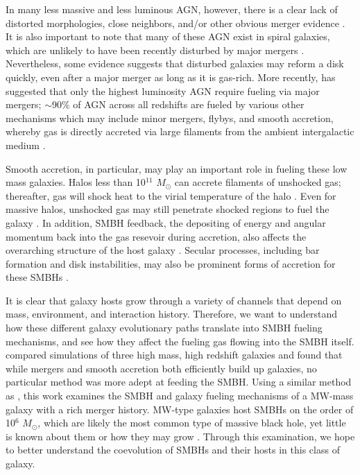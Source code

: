 \documentclass[manuscript]{aastex}
\begin{document}
In many less massive and less luminous AGN, however, there is a clear lack of distorted morphologies, close neighbors, and/or other obvious merger evidence \citep{Ryan2007,Schawinski2011,Ellison2013,Hicks2013}. It is also important to note that many of these AGN exist in spiral galaxies, which are unlikely to have been recently disturbed by major mergers \citep{Schawinski2011,Kocevski2011}. Nevertheless, some evidence suggests \citep{vanGorkom1997,Governato2009} that disturbed galaxies may reform a disk quickly, even after a major merger as long as it is gas-rich. More recently, \cite{Treister2012} has suggested that only the highest luminosity AGN require fueling via major mergers; $\sim$90\% of AGN across all redshifts are fueled by various other mechanisms which may include minor mergers, flybys, and smooth accretion, whereby gas is directly accreted via large filaments from the ambient intergalactic medium \citep{Cox2006,Bellovary2013,Sinha2012}. 

Smooth accretion, in particular, may play an important role in fueling these low mass galaxies. Halos less than 10$^{11}$ $M_{\odot}$ can accrete filaments of unshocked gas; thereafter, gas will shock heat to the virial temperature of the halo \citep{Keres2005}. Even for massive halos, unshocked gas may still penetrate shocked regions to fuel the galaxy \citep{Brooks2007,Dekel2009,Nelson2013}. In addition, SMBH feedback, the depositing of energy and angular momentum back into the gas resevoir during accretion, also affects the overarching structure of the host galaxy \citep{Governato2009a}. Secular processes, including bar formation and disk instabilities, may also be prominent forms of accretion for these SMBHs \citep{Kormendy2013}. 

It is clear that galaxy hosts grow through a variety of channels that depend on mass, environment, and interaction history. Therefore, we want to understand how these different galaxy evolutionary paths translate into SMBH fueling mechanisms, and see how they affect the fueling gas flowing into the SMBH itself. \cite{Bellovary2013} compared simulations of three high mass, high redshift galaxies and found that while mergers and smooth accretion both efficiently build up galaxies, no particular method was more adept at feeding the SMBH. Using a similar method as \cite{Bellovary2013}, this work examines the SMBH and galaxy fueling mechanisms of a MW-mass galaxy with a rich merger history. MW-type galaxies host SMBHs on the order of 10$^6$ $M_{\odot}$, which are likely the most common type of massive black hole, yet little is known about them or how they may grow \citep{Kormendy2013}. Through this examination, we hope to better understand the coevolution of SMBHs and their hosts in this class of galaxy. 
\end{document}
